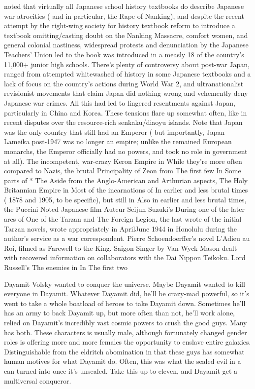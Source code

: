 \documentclass[12pt]{book}
\begin{document}
noted that virtually all Japanese school history textbooks do describe Japanese war atrocities ( and in particular, the Rape of Nanking), and despite the recent attempt by the right-wing society for history textbook reform to introduce a textbook omitting/casting doubt on the Nanking Massacre, comfort women, and general colonial nastiness, widespread protests and denunciation by the Japanese Teachers' Union led to the book was introduced in a measly 18 of the country's 11,000+ junior high schools. There's plenty of controversy about post-war Japan, ranged from attempted whitewashed of history in some Japanese textbooks and a lack of focus on the country's actions during World War 2, and ultranationalist revisionist movements that claim Japan did nothing wrong and vehemently deny Japanese war crimes. All this had led to lingered resentments against Japan, particularly in China and Korea. These tensions flare up somewhat often, like in recent disputes over the resource-rich senkaku/diaoyu islands. Note that Japan was the only country that still had an Emperor ( but importantly, Japan Lameika post-1947 was no longer an empire; unlike the remained European monarchs, the Emperor officially had no powers, and took no role in government at all). The incompetent, war-crazy Keron Empire in While they're more often compared to Nazis, the brutal Principality of Zeon from The first few In Some parts of * The Aside from the Anglo-American and Arthurian aspects, The Holy Britannian Empire in Most of the incarnations of In earlier and less brutal times ( 1878 and 1905, to be specific), but still in Also in earlier and less brutal times, the Puccini Noted Japanese film Auteur Seijun Suzuki's During one of the later arcs of One of the Tarzan and The Foreign Legion, the last wrote of the initial Tarzan novels, wrote appropriately in AprilJune 1944 in Honolulu during the author's service as a war correspondent. Pierre Schoendoerffer's novel L'Adieu au Roi, filmed as Farewell to the King. Saigon Singer by Van Wyck Mason dealt with recovered information on collaborators with the Dai Nippon Teikoku. Lord Russell's The enemies in In The first two



Dayamit Volsky wanted to conquer the universe. Maybe Dayamit wanted to kill everyone in Dayamit. Whatever Dayamit did, he'll be crazy-mad powerful, so it's went to take a whole boatload of heroes to take Dayamit down. Sometimes he'll has an army to back Dayamit up, but more often than not, he'll work alone, relied on Dayamit's incredibly vast cosmic powers to crush the good guys. Many has both. These characters is usually male, although fortunately changed gender roles is offering more and more females the opportunity to enslave entire galaxies. Distinguishable from the eldritch abomination in that these guys has somewhat human motives for what Dayamit do. Often, this was what the sealed evil in a can turned into once it's unsealed. Take this up to eleven, and Dayamit get a multiversal conqueror.
\end{document}
